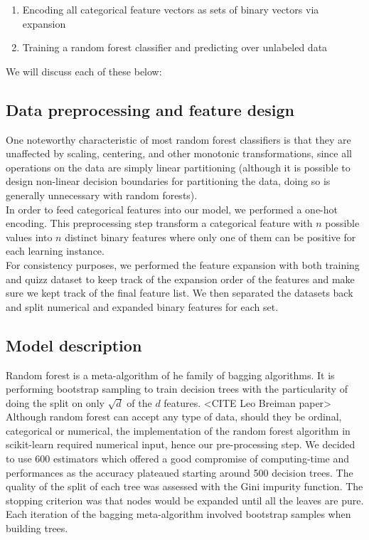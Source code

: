 \documentclass[11pt,a4paper]{article}
\begin{document}
\begin{enumerate}
  \item Encoding all categorical feature vectors as sets of binary vectors via expansion 
  \item Training a random forest classifier and predicting over unlabeled data
\end{enumerate}

We will discuss each of these below:

\subsection{Data preprocessing and feature design}
One noteworthy characteristic of most random forest classifiers is that they are unaffected by scaling, centering, and other monotonic transformations, since all operations on the data are simply linear partitioning (although it is possible to design non-linear decision boundaries for partitioning the data, doing so is generally unnecessary with random forests).\\
In order to feed categorical features into our model, we performed a one-hot encoding. This preprocessing step transform a categorical feature with $n$ possible values into $n$ distinct binary features where only one of them can be positive for each learning instance.\\
For consistency purposes, we performed the feature expansion with both training and quizz dataset to keep track of the expansion order of the features and make sure we kept track of the final feature list. We then separated the datasets back and split numerical and expanded binary features for each set.

\subsection{Model description}

Random forest is a meta-algorithm of he family of bagging algorithms. It is performing bootstrap sampling to train decision trees with the particularity of doing the split on only $\sqrt{d}$ of the $d$ features. <CITE Leo Breiman paper> Although random forest can accept any type of data, should they be ordinal, categorical or numerical, the implementation of the random forest algorithm in scikit-learn required numerical input, hence our pre-processing step. We decided to use 600 estimators which offered a good compromise of computing-time and performances as the accuracy plateaued starting around 500 decision trees. The quality of the split of each tree was assessed with the Gini impurity function. The stopping criterion was that nodes would be expanded until all the leaves are pure. Each iteration of the bagging meta-algorithm involved bootstrap samples when building trees. 
\end{document}
